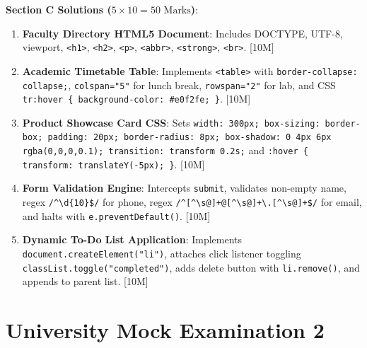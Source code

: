 \begin{solutionbox}
\medskip
\noindent\textbf{Section C Solutions ($5 \times 10 = 50\text{ Marks}$)}:
\begin{enumerate}[start=17]
    \item \textbf{Faculty Directory HTML5 Document}: Includes DOCTYPE, UTF-8, viewport, \texttt{<h1>}, \texttt{<h2>}, \texttt{<p>}, \texttt{<abbr>}, \texttt{<strong>}, \texttt{<br>}. [10M]
    \item \textbf{Academic Timetable Table}: Implements \texttt{<table>} with \texttt{border-collapse: collapse;}, \texttt{colspan="5"} for lunch break, \texttt{rowspan="2"} for lab, and CSS \texttt{tr:hover \{ background-color: \#e0f2fe; \}}. [10M]
    \item \textbf{Product Showcase Card CSS}: Sets \texttt{width: 300px; box-sizing: border-box; padding: 20px; border-radius: 8px; box-shadow: 0 4px 6px rgba(0,0,0,0.1); transition: transform 0.2s;} and \texttt{:hover \{ transform: translateY(-5px); \}}. [10M]
    \item \textbf{Form Validation Engine}: Intercepts \texttt{submit}, validates non-empty name, regex \texttt{/\textasciicircum\textbackslash d\{10\}\$/} for phone, regex \texttt{/\textasciicircum[\textasciicircum\textbackslash s@]+@[\textasciicircum\textbackslash s@]+\textbackslash.[\textasciicircum\textbackslash s@]+\$/} for email, and halts with \texttt{e.preventDefault()}. [10M]
    \item \textbf{Dynamic To-Do List Application}: Implements \texttt{document.createElement("li")}, attaches click listener toggling \texttt{classList.toggle("completed")}, adds delete button with \texttt{li.remove()}, and appends to parent list. [10M]
\end{enumerate}
\end{solutionbox}

\section{University Mock Examination 2}

